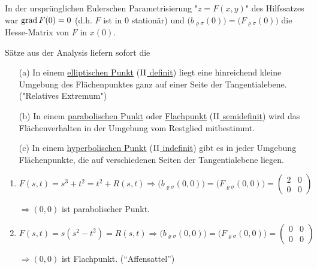 In der ursprünglichen Eulerschen Parametrisierung "\(z = F(x,y)\)" des Hilfssatzes war \(\operatorname{grad} F(0) = 0\) (d.h. \(F\) ist  in \(0\) stationär) und \(\big(b_{\varrho \sigma}(0)\big) = \big(F_{\varrho \sigma}(0)\big)\) die Hesse-Matrix von \(F\) in \(x(0)\). \par

Sätze aus der Analysis liefern sofort die 

\begin{folgerung}
 \begin{enumerate}
  \item[(a)] In einem \uline{elliptischen Punkt} (\uline{\(\Rom2\) definit}) liegt eine hinreichend kleine Umgebung des Flächenpunktes ganz auf einer Seite der Tangentialebene. ("Relatives Extremum")
  \item[(b)] In einem \uline{parabolischen Punkt} oder \uline{Flachpunkt} (\uline{\(\Rom2\) semidefinit}) wird das Flächenverhalten in der Umgebung vom Restglied mitbestimmt.
  \item[(c)] In einem \uline{hyperbolischen Punkt} (\uline{\(\Rom2\) indefinit}) gibt es in jeder Umgebung Flächenpunkte, die auf verschiedenen Seiten der Tangentialebene liegen.
 \end{enumerate}
\end{folgerung}

\begin{bsp}[zu (b)]
 \begin{enumerate}
  \item \(F(s,t) = s^3 + t^2 = t^2 + R(s,t) \Rightarrow \big(b_{\varrho \sigma}(0,0)\big) = \big(F_{\varrho \sigma}(0,0)\big) = \begin{pmatrix}
																 2 & 0 \\
																 0 & 0
																\end{pmatrix}\) \par
  \(\Rightarrow (0,0)\) ist parabolischer Punkt.
  \item \(F(s,t) = s(s^2 - t^2) =  R(s,t) \Rightarrow \big(b_{\varrho \sigma}(0,0)\big) = \big(F_{\varrho \sigma} (0,0)\big) = \begin{pmatrix}
																0 & 0 \\
																0 & 0
															       \end{pmatrix}\) \par
  \(\Rightarrow (0,0)\) ist Flachpunkt. ("`Affensattel"')
 \end{enumerate}
\end{bsp}

